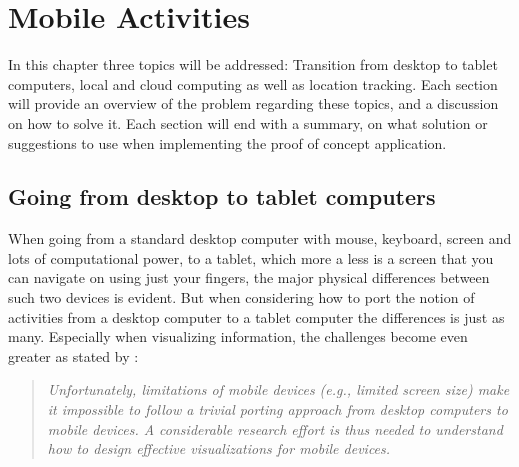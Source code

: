 \chapter{Mobile Activities}
In this chapter three topics will be addressed: Transition from desktop to tablet computers, local and cloud computing as well as location tracking. Each section will provide an overview of the problem regarding these topics, and a discussion on how to solve it. Each section will end with a summary, on what solution or suggestions to use when implementing the proof of concept application.

\section{Going from desktop to tablet computers}
When going from a standard desktop computer with mouse, keyboard, screen and lots of computational power, to a tablet, which more a less is a screen that you can navigate on using just your fingers, the major physical differences between such two devices is evident. But when considering how to port the notion of activities from a desktop computer to a tablet computer the differences is just as many. Especially when visualizing information, the challenges become even greater as stated by \citet{chittaro}:

\begin{quotation}
\emph{
Unfortunately, limitations of mobile devices (e.g., limited screen size) make it impossible to follow a trivial porting approach from desktop computers to mobile devices. A considerable research effort is thus needed to understand how to design effective visualizations for mobile devices.
}
\end{quotation}

